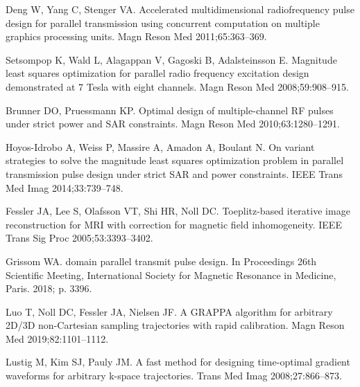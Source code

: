 \documentclass[11pt]{article}
\begin{document}
\begin{thebibliography}{10}
Deng W, Yang C, Stenger VA.
\newblock Accelerated multidimensional radiofrequency pulse design for parallel
  transmission using concurrent computation on multiple graphics processing
  units.
\newblock Magn Reson Med 2011;\hspace{0pt}65:363--369.

Setsompop K, Wald L, Alagappan V, Gagoski B, Adalsteinsson E.
\newblock Magnitude least squares optimization for parallel radio frequency
  excitation design demonstrated at 7 {Tesla} with eight channels.
\newblock Magn Reson Med 2008;\hspace{0pt}59:908--915.

Brunner DO, Pruessmann KP.
\newblock Optimal design of multiple-channel {RF} pulses under strict power and
  {SAR} constraints.
\newblock Magn Reson Med 2010;\hspace{0pt}63:1280--1291.

Hoyos-Idrobo A, Weiss P, Massire A, Amadon A, Boulant N.
\newblock On variant strategies to solve the magnitude least squares
  optimization problem in parallel transmission pulse design under strict {SAR}
  and power constraints.
\newblock IEEE Trans Med Imag 2014;\hspace{0pt}33:739--748.

Fessler JA, Lee S, Olafsson VT, Shi HR, Noll DC.
\newblock Toeplitz-based iterative image reconstruction for {MRI} with
  correction for magnetic field inhomogeneity.
\newblock IEEE Trans Sig Proc 2005;\hspace{0pt}53:3393--3402.

Grissom WA.
 domain parallel transmit pulse design.
\newblock In Proceedings 26th Scientific Meeting, International Society for
  Magnetic Resonance in Medicine, Paris. 2018;\hspace{0pt} p. 3396.

Luo T, Noll DC, Fessler JA, Nielsen JF.
\newblock A {GRAPPA} algorithm for arbitrary {2D/3D} non-{Cartesian} sampling
  trajectories with rapid calibration.
\newblock Magn Reson Med 2019;\hspace{0pt}82:1101--1112.

Lustig M, Kim SJ, Pauly JM.
\newblock A fast method for designing time-optimal gradient waveforms for
  arbitrary k-space trajectories.
 Trans Med Imag 2008;\hspace{0pt}27:866--873.


\end{thebibliography}
\end{document}
